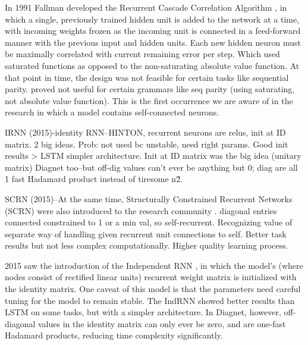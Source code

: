 \documentclass{article}
\begin{document}
In 1991 Fallman developed the Recurrent Cascade Correlation Algorithm \citet{Fahlman1990TheRC}, in which a single, previously trained hidden unit is added to the network at a time, with incoming weights frozen as the incoming unit is connected in a feed-forward manner with the previous input and hidden units. Each new hidden neuron must be maximally correlated with current remaining error per step.  
Which used saturated functions as opposed to the non-saturating absolute value function.  At that point in time, the design was not feasible for certain tasks like sequential parity.  proved not useful for certain grammars like seq parity (using saturating, not absolute value function). This is the first occurrence we are aware of in the research in which a model contains self-connected neurons.

IRNN (2015)-identity RNN--HINTON, recurrent neurons are relus, init at ID matrix. 2 big ideas. Prob: not used bc unstable, need right params.  Good init results > LSTM simpler architecture. Init at ID matrix was the big idea (unitary matrix) Diagnet too--but off-dig values can't ever be anything but 0; diag are all 1 fast Hadamard product instead of tiresome n\^2. 

SCRN (2015)--At the same time, Structurally Constrained Recurrent Networks (SCRN) were also introduced to the research community \citet{MikolovJCMR14}. diagonal entries connected constrained to 1 or a min val, so self-recurrent.  Recognizing value of separate way of handling given recurrent unit connections to self.  Better task results but not less complex computationally. Higher quality learning process.

2015 saw the introduction of the Independent RNN \citet{LeJH15}, in which the model's (where nodes consist of rectified linear units) recurrent weight matrix is initialized with the identity matrix.  One caveat of this model is that the parameters need careful tuning for the model to remain stable.  The IndRNN showed better results than LSTM on some tasks, but with a simpler architecture.  In Diagnet, however, off-diagonal values in the identity matrix can only ever be zero, and are one-fast Hadamard products, reducing time complexity significantly. 

\end{document}
